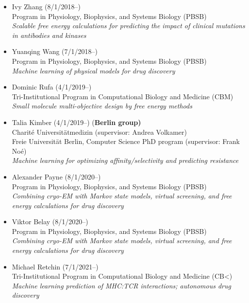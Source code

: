 \documentclass[10pt]{article}
\begin{document}
\begin{itemize}
  \item Ivy Zhang (8/1/2018--)\\
  Program in Physiology, Biophysics, and Systems Biology (PBSB)\\
  \emph{Scalable free energy calculations for predicting the impact of clinical mutations in antibodies and kinases}
  
  \item Yuanqing Wang (7/1/2018--)\\
  Program in Physiology, Biophysics, and Systems Biology (PBSB)\\
  \emph{Machine learning of physical models for drug discovery}
  
  \item Dominic Rufa (4/1/2019--)\\
  Tri-Institutional Program in Computational Biology and Medicine (CBM)\\
  \emph{Small molecule multi-objective design by free energy methods}

  \item Talia Kimber (4/1/2019--) {(\bf Berlin group)}\\
  Charit\'e Universit\"{a}tmedizin (supervisor: Andrea Volkamer)\\
  Freie Universit\"{a}t Berlin, Computer Science PhD program (supervisor: Frank No\'{e})\\
  \emph{Machine learning for optimizing affinity/selectivity and predicting resistance}
  
  \item Alexander Payne (8/1/2020--)\\
  Program in Physiology, Biophysics, and Systems Biology (PBSB)\\
  \emph{Combining cryo-EM with Markov state models, virtual screening, and free energy calculations for drug discovery}
  
  \item Viktor Belay (8/1/2020--)\\
  Program in Physiology, Biophysics, and Systems Biology (PBSB)\\
  \emph{Combining cryo-EM with Markov state models, virtual screening, and free energy calculations for drug discovery}

  \item Michael Retchin (7/1/2021--)\\
  Tri-Institutional Program in Computational Biology and Medicine (CB<)\\
  \emph{Machine learning prediction of MHC:TCR interactions; autonomous drug discovery}

\end{itemize}
\end{document}
